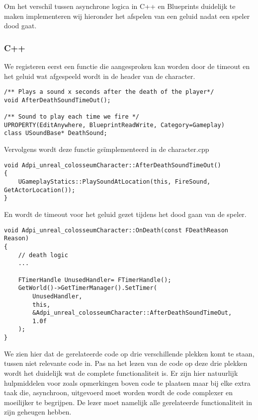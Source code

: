 Om het verschil tussen asynchrone logica in C++ en Blueprints duidelijk te maken implementeren wij hieronder het afspelen van een geluid nadat een speler dood gaat.

\subsubsection{C++}
We registeren eerst een functie die aangesproken kan worden door de timeout en het geluid wat afgespeeld wordt in de header van de character.

\begin{lstlisting}[caption=Registratie van de timeout functie en het geluid]	
/** Plays a sound x seconds after the death of the player*/
void AfterDeathSoundTimeOut();

/** Sound to play each time we fire */
UPROPERTY(EditAnywhere, BlueprintReadWrite, Category=Gameplay)
class USoundBase* DeathSound;
\end{lstlisting}

Vervolgens wordt deze functie geïmplementeerd in de character.cpp

\begin{lstlisting}[caption=Registratie van de timeout functie en het geluid]
void Adpi_unreal_colosseumCharacter::AfterDeathSoundTimeOut() 
{
	UGameplayStatics::PlaySoundAtLocation(this, FireSound, GetActorLocation());
}
\end{lstlisting}

En wordt de timeout voor het geluid gezet tijdens het dood gaan van de speler.

\begin{lstlisting}[caption=Implementatie van de OnDeath functie]
void Adpi_unreal_colosseumCharacter::OnDeath(const FDeathReason Reason)
{
	// death logic
	...

	FTimerHandle UnusedHandler= FTimerHandle();
	GetWorld()->GetTimerManager().SetTimer(
		UnusedHandler, 
		this, 
		&Adpi_unreal_colosseumCharacter::AfterDeathSoundTimeOut, 
		1.0f
	);
}
\end{lstlisting}

We zien hier dat de gerelateerde code op drie verschillende plekken komt te staan, tussen niet relevante code in. Pas na het lezen van de code op deze drie plekken wordt het duidelijk wat de complete functionaliteit is. Er zijn hier natuurlijk hulpmiddelen voor zoals opmerkingen boven code te plaatsen maar bij elke extra taak die, asynchroon, uitgevoerd moet worden wordt de code complexer en moeilijker te begrijpen. De lezer moet namelijk alle gerelateerde functionaliteit in zijn geheugen hebben.

